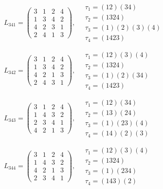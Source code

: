$L_{341} = \begin{pmatrix} 3 & 1 & 2 & 4 \\ 1 & 3 & 4 & 2 \\ 4 & 2 & 3 & 1 \\ 2 & 4 & 1 & 3 \end{pmatrix}, \quad \begin{matrix} \tau_{1} = (1 2)(3 4) \\ \tau_{2} = (1 3 2 4) \\ \tau_{3} = (1)(2)(3)(4) \\ \tau_{4} = (1 4 2 3) \end{matrix}$

$L_{342} = \begin{pmatrix} 3 & 1 & 2 & 4 \\ 1 & 3 & 4 & 2 \\ 4 & 2 & 1 & 3 \\ 2 & 4 & 3 & 1 \end{pmatrix}, \quad \begin{matrix} \tau_{1} = (1 2)(3)(4) \\ \tau_{2} = (1 3 2 4) \\ \tau_{3} = (1)(2)(3 4) \\ \tau_{4} = (1 4 2 3) \end{matrix}$

$L_{343} = \begin{pmatrix} 3 & 1 & 2 & 4 \\ 1 & 4 & 3 & 2 \\ 2 & 3 & 4 & 1 \\ 4 & 2 & 1 & 3 \end{pmatrix}, \quad \begin{matrix} \tau_{1} = (1 2)(3 4) \\ \tau_{2} = (1 3)(2 4) \\ \tau_{3} = (1)(2 3)(4) \\ \tau_{4} = (1 4)(2)(3) \end{matrix}$

$L_{344} = \begin{pmatrix} 3 & 1 & 2 & 4 \\ 1 & 4 & 3 & 2 \\ 4 & 2 & 1 & 3 \\ 2 & 3 & 4 & 1 \end{pmatrix}, \quad \begin{matrix} \tau_{1} = (1 2)(3)(4) \\ \tau_{2} = (1 3 2 4) \\ \tau_{3} = (1)(2 3 4) \\ \tau_{4} = (1 4 3)(2) \end{matrix}$

